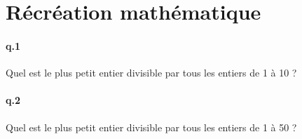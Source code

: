 \documentclass[10pt,a4paper]{article}
\begin{document}
%
%
\section{Récréation mathématique}
\paragraph{q.1}Quel est le plus petit entier divisible par tous les entiers de 1 à 10 ?
\paragraph{q.2}Quel est le plus petit entier divisible par tous les entiers de 1 à 50 ?
\end{document}
